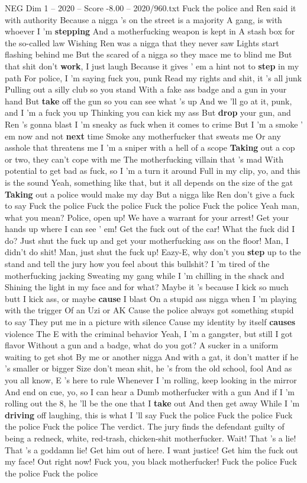 \begin{textsample}{NEG Dim 1 – 2020 – Score -8.00 – 2020/960.txt}
Fuck the police and Ren said it with authority Because a nigga 's on the street is a majority A gang, is with whoever I 'm \textbf{stepping} And a motherfucking weapon is kept in A stash box for the so-called law Wishing Ren was a nigga that they never saw Lights start flashing behind me But the scared of a nigga so they mace me to blind me But that shit don't \textbf{work}, I just laugh Because it gives ' em a hint not to \textbf{step} in my path For police, I 'm saying fuck you, punk Read my rights and shit, it 's all junk Pulling out a silly club so you stand With a fake ass badge and a gun in your hand But \textbf{take} off the gun so you can see what 's up And we 'll go at it, punk, and I 'm a fuck you up Thinking you can kick my ass But \textbf{drop} your gun, and Ren 's gonna blast I 'm sneaky as fuck when it comes to crime But I 'm a smoke ' em now and not \textbf{next} time Smoke any motherfucker that sweats me Or any asshole that threatens me I 'm a sniper with a hell of a scope \textbf{Taking} out a cop or two, they can't cope with me The motherfucking villain that 's mad With potential to get bad as fuck, so I 'm a turn it around Full in my clip, yo, and this is the sound Yeah, something like that, but it all depends on the size of the gat \textbf{Taking} out a police would make my day But a nigga like Ren don't give a fuck to say Fuck the police Fuck the police Fuck the police Fuck the police Yeah man, what you mean?
Police, open up!
We have a warrant for your arrest!
Get your hands up where I can see ' em!
Get the fuck out of the car!
What the fuck did I do?
Just shut the fuck up and get your motherfucking ass on the floor!
Man, I didn't do shit!
Man, just shut the fuck up!
Eazy-E, why don't you \textbf{step} up to the stand and tell the jury how you feel about this bullshit?
I 'm tired of the motherfucking jacking Sweating my gang while I 'm chilling in the shack and Shining the light in my face and for what?
Maybe it 's because I kick so much butt I kick ass, or maybe \textbf{cause} I blast On a stupid ass nigga when I 'm playing with the trigger Of an Uzi or AK Cause the police always got something stupid to say They put me in a picture with silence Cause my identity by itself \textbf{causes} violence The E with the criminal behavior Yeah, I 'm a gangster, but still I got flavor Without a gun and a badge, what do you got?
A sucker in a uniform waiting to get shot By me or another nigga And with a gat, it don't matter if he 's smaller or bigger Size don't mean shit, he 's from the old school, fool And as you all know, E 's here to rule Whenever I 'm rolling, keep looking in the mirror And end on cue, yo, so I can hear a Dumb motherfucker with a gun And if I 'm rolling out the 8, he 'll be the one that I \textbf{take} out And then get away While I 'm \textbf{driving} off laughing, this is what I 'll say Fuck the police Fuck the police Fuck the police Fuck the police The verdict.
The jury finds the defendant guilty of being a redneck, white, red-trash, chicken-shit motherfucker.
Wait!
That 's a lie!
That 's a goddamn lie!
Get him out of here.
I want justice!
Get him the fuck out my face!
Out right now!
Fuck you, you black motherfucker!
Fuck the police Fuck the police Fuck the police

\end{textsample}
